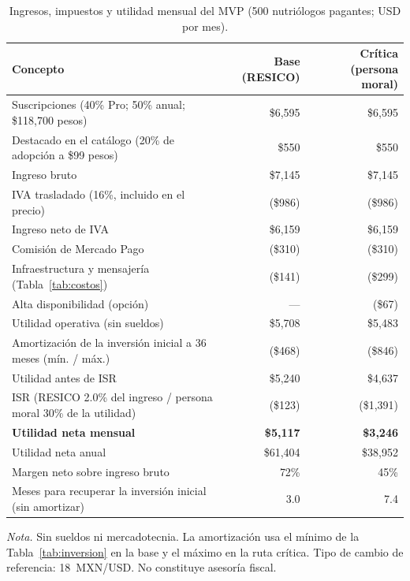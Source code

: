 \documentclass[12pt, a4paper]{article}
\begin{document}
\begin{table}[!ht]
  \centering
  \caption{Ingresos, impuestos y utilidad mensual del MVP (500 nutriólogos
  pagantes; USD por mes).}
  \label{tab:ingresos}
  \footnotesize
  \begin{tabularx}{\textwidth}{X r r}
    \toprule
    \textbf{Concepto} & \textbf{Base (RESICO)} & \textbf{Crítica (persona moral)} \\
    \midrule
    Suscripciones (40\% Pro; 50\% anual; \$118,700 pesos) & \$6,595 & \$6,595 \\
    Destacado en el catálogo (20\% de adopción a \$99 pesos) & \$550 & \$550 \\
    Ingreso bruto & \$7,145 & \$7,145 \\
    IVA trasladado (16\%, incluido en el precio) & (\$986) & (\$986) \\
    Ingreso neto de IVA & \$6,159 & \$6,159 \\
    Comisión de Mercado Pago & (\$310) & (\$310) \\
    Infraestructura y mensajería (Tabla~\ref{tab:costos}) & (\$141) & (\$299) \\
    Alta disponibilidad (opción) & --- & (\$67) \\
    Utilidad operativa (sin sueldos) & \$5,708 & \$5,483 \\
    Amortización de la inversión inicial a 36 meses (mín. / máx.) & (\$468) & (\$846) \\
    Utilidad antes de ISR & \$5,240 & \$4,637 \\
    ISR (RESICO 2.0\% del ingreso / persona moral 30\% de la utilidad) & (\$123) & (\$1,391) \\
    \textbf{Utilidad neta mensual} & \textbf{\$5,117} & \textbf{\$3,246} \\
    Utilidad neta anual & \$61,404 & \$38,952 \\
    Margen neto sobre ingreso bruto & 72\% & 45\% \\
    Meses para recuperar la inversión inicial (sin amortizar) & 3.0 & 7.4 \\
    \bottomrule
  \end{tabularx}
  \begin{flushleft}
    \small\textit{Nota.} Sin sueldos ni mercadotecnia. La amortización usa el
    mínimo de la Tabla~\ref{tab:inversion} en la base y el máximo en la
    ruta crítica. Tipo de cambio de referencia: 18~MXN/USD. No constituye asesoría fiscal.
  \end{flushleft}
\end{table}
\end{document}
